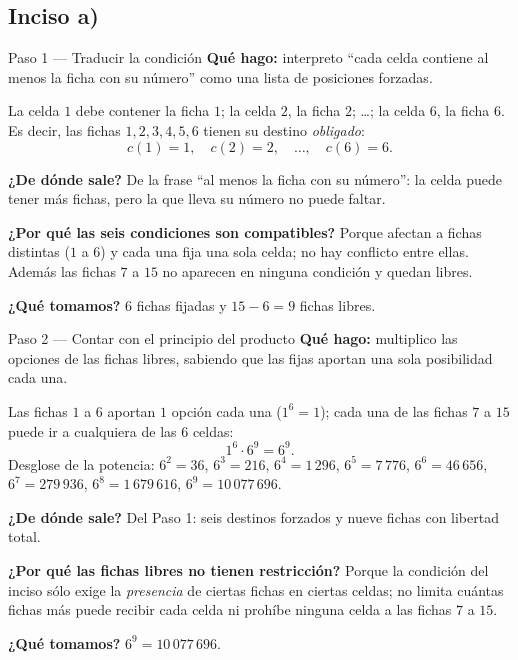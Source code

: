 \documentclass[11pt]{article}
\begin{document}
\subsection*{Inciso a)}

\begin{paso}{Paso 1 --- Traducir la condición}
\textbf{Qué hago:} interpreto ``cada celda contiene al menos la ficha con su número'' como una lista de posiciones forzadas.

La celda $1$ debe contener la ficha $1$; la celda $2$, la ficha $2$; \ldots; la celda $6$, la ficha $6$. Es decir, las fichas $1,2,3,4,5,6$ tienen su destino \emph{obligado}:
\[
c(1)=1,\quad c(2)=2,\quad \dots,\quad c(6)=6 .
\]

\textbf{¿De dónde sale?} De la frase ``al menos la ficha con su número'': la celda puede tener más fichas, pero la que lleva su número no puede faltar.

\textbf{¿Por qué las seis condiciones son compatibles?} Porque afectan a fichas distintas ($1$ a $6$) y cada una fija una sola celda; no hay conflicto entre ellas. Además las fichas $7$ a $15$ no aparecen en ninguna condición y quedan libres.

\textbf{¿Qué tomamos?} $6$ fichas fijadas y $15-6 = 9$ fichas libres.
\end{paso}

\begin{paso}{Paso 2 --- Contar con el principio del producto}
\textbf{Qué hago:} multiplico las opciones de las fichas libres, sabiendo que las fijas aportan una sola posibilidad cada una.

Las fichas $1$ a $6$ aportan $1$ opción cada una ($1^6 = 1$); cada una de las fichas $7$ a $15$ puede ir a cualquiera de las $6$ celdas:
\[
1^{6}\cdot 6^{9} = 6^{9} .
\]
Desglose de la potencia: $6^2 = 36$, $6^3 = 216$, $6^4 = 1\,296$, $6^5 = 7\,776$, $6^6 = 46\,656$, $6^7 = 279\,936$, $6^8 = 1\,679\,616$, $6^9 = 10\,077\,696$.

\textbf{¿De dónde sale?} Del Paso 1: seis destinos forzados y nueve fichas con libertad total.

\textbf{¿Por qué las fichas libres no tienen restricción?} Porque la condición del inciso sólo exige la \emph{presencia} de ciertas fichas en ciertas celdas; no limita cuántas fichas más puede recibir cada celda ni prohíbe ninguna celda a las fichas $7$ a $15$.

\textbf{¿Qué tomamos?} $6^9 = 10\,077\,696$.
\end{paso}
\end{document}
